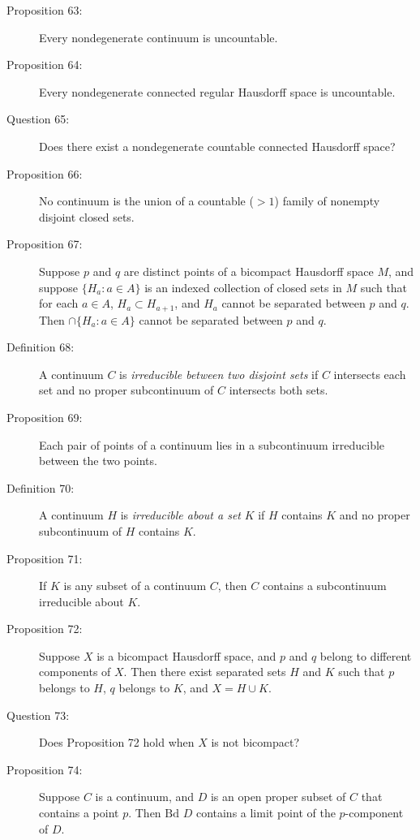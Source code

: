 \documentclass{article}
\begin{document}
\begin{description}
  \item[Proposition 63:] Every nondegenerate continuum is uncountable.

  \item[Proposition 64:] Every nondegenerate connected regular Hausdorff space is uncountable.

  \item[Question 65:] Does there exist a nondegenerate countable connected Hausdorff space?

  \item[Proposition 66:] No continuum is the union of a countable ($>1$) family of nonempty disjoint closed sets.

  \item[Proposition 67:] Suppose $p$ and $q$ are distinct points of a bicompact Hausdorff space $M$, and suppose $\{ H_a: a \in A \}$ is an indexed collection of closed sets in $M$ such that for each $a \in A$, $H_a \subset H_{a+1}$, and $H_a$ cannot be separated between $p$ and $q$. Then $\cap \{ H_a: a \in A \}$ cannot be separated between $p$ and $q$.

  \item[Definition 68:] A continuum $C$ is \emph{irreducible between two disjoint sets} if $C$ intersects each set and no proper subcontinuum of $C$ intersects both sets.

  \item[Proposition 69:] Each pair of points of a continuum lies in a subcontinuum irreducible between the two points.

  \item[Definition 70:] A continuum $H$ is \emph{irreducible about a set} $K$ if $H$ contains $K$ and no proper subcontinuum of $H$ contains $K$.

  \item[Proposition 71:] If $K$ is any subset of a continuum $C$, then $C$ contains a subcontinuum irreducible about $K$.

  \item[Proposition 72:] Suppose $X$ is a bicompact Hausdorff space, and $p$ and $q$ belong to different components of $X$. Then there exist separated sets $H$ and $K$ such that $p$ belongs to $H$, $q$ belongs to $K$, and $X = H \cup K$.

  \item[Question 73:] Does Proposition 72 hold when $X$ is not bicompact?

  \item[Proposition 74:] Suppose $C$ is a continuum, and $D$ is an open proper subset of $C$ that contains a point $p$. Then $\text{Bd } D$ contains a limit point of the $p$-component of $D$.


\end{description}
\end{document}

